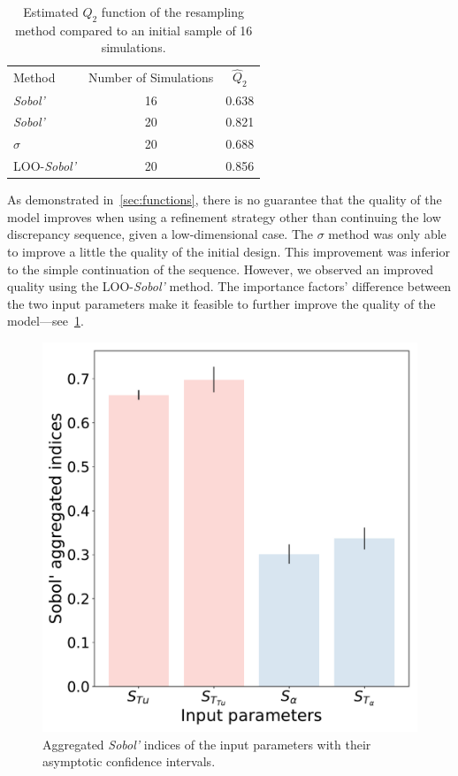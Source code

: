 \begin{table}[ht]
\centering
\begin{tabular}{lcc}
\toprule
Method & Number of Simulations &$\hat{Q}_2$\\
\cmidrule{2-3}
\textit{Sobol'}&16 & 0.638\\
\textit{Sobol'}&20& 0.821\\
\textit{$\sigma$}&20& 0.688\\
LOO-\textit{Sobol'}&20& 0.856\\
\bottomrule
\end{tabular}
\caption{Estimated $Q_2$ function of the resampling method compared to an initial sample of 16 simulations.}
\label{tab:ls89-q2}
\end{table}

As demonstrated in~\cref{sec:functions}, there is no guarantee that the quality of the model improves when using a refinement strategy other than continuing the low discrepancy sequence, given a low-dimensional case. The $\sigma$ method was only able to improve a little the quality of the initial design. This improvement was inferior to the simple continuation of the sequence. However, we observed an improved quality using the LOO-\textit{Sobol'} method. The importance factors' difference between the two input parameters make it feasible to further improve the quality of the model---see~\cref{fig:ls89-aggregated}.

\begin{figure}[ht]
\centering
\includegraphics[width=0.5\linewidth]{fig/applications/ls89/15_1column_color-online-only_aggregated_indices.pdf}
\caption{Aggregated \textit{Sobol'} indices of the input parameters with their asymptotic confidence intervals.}
\label{fig:ls89-aggregated}
\end{figure}

